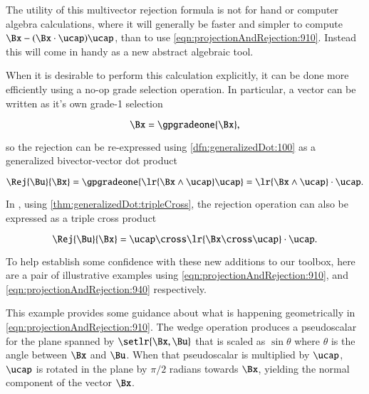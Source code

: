 The utility of this multivector rejection formula is not for hand or computer algebra calculations, where it will generally be faster and simpler to compute \( \Bx - (\Bx \cdot \ucap) \ucap \), than to use \cref{eqn:projectionAndRejection:910}.
Instead this will come in handy as a new abstract algebraic tool.

When it is desirable to perform this calculation explicitly, it can be done more efficiently using a no-op grade selection operation.
In particular, a vector can be written as it's own grade-1 selection

\begin{dmath}\label{eqn:projectionAndRejection:920}
\Bx = \gpgradeone{ \Bx },
\end{dmath}

so the rejection can be re-expressed
using \cref{dfn:generalizedDot:100}
as a generalized bivector-vector dot product

\begin{equation}\label{eqn:projectionAndRejection:940}
\Rej{\Bu}{\Bx}
= \gpgradeone{ \lr{ \Bx \wedge \ucap } \ucap }
= \lr{ \Bx \wedge \ucap } \cdot \ucap.
\end{equation}

In , using \cref{thm:generalizedDot:tripleCross}, the rejection operation can also be expressed as a triple cross product

\begin{dmath}\label{eqn:projectionAndRejection:1140}
\Rej{\Bu}{\Bx}
= \ucap \cross \lr{ \Bx \cross \ucap } \cdot \ucap.
\end{dmath}

To help establish some confidence with these new additions to our toolbox, here are a
pair of illustrative examples using
\cref{eqn:projectionAndRejection:910}, and
\cref{eqn:projectionAndRejection:940} respectively.


This example provides some guidance about what is happening geometrically in
\cref{eqn:projectionAndRejection:910}.
The wedge operation produces a pseudoscalar for the plane spanned by \( \setlr{\Bx, \Bu} \) that is scaled as \( \sin\theta \) where \( \theta \) is the angle between \( \Bx \) and \( \Bu \).
When that pseudoscalar is multiplied by \( \ucap \), \( \ucap \) is rotated in the plane by \( \pi/2 \) radians towards \( \Bx \), yielding the normal component of the vector \( \Bx \).

